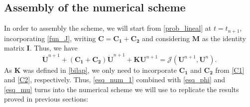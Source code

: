 \documentclass[12pt]{article}
\numberwithin{equation}{section}
\begin{document}
\subsection{Assembly of the numerical scheme}
In order to assembly the scheme, we will start from \eqref{prob_lineal} at $t = t_{n+1}$, incorporating \eqref{fun_J}, writing $\boldsymbol{C} = \boldsymbol{C_1} + \boldsymbol{C_2}$ and considering $\boldsymbol{M}$ as the identity matrix $\boldsymbol I$. Thus, we have 
\begin{equation}\label{esq_num_1}
    \boldsymbol{\ddot{U}}^{n+1} + (\boldsymbol{C_1+C_2})\boldsymbol{\dot{U}}^{n+1}+\boldsymbol{KU}^{n+1} = \mathcal{J}(\boldsymbol{U}^{n+1},\boldsymbol{U}^n).
\end{equation}
As $\boldsymbol{K}$ was defined in \eqref{bilap}, we only need to incorporate $\boldsymbol{C_1}$ and $\boldsymbol{C_2}$ from \eqref{C1} and \eqref{C2}, respectively. Thus, \eqref{esq_num_1} combined with \eqref{esq_phi} and \eqref{esq_mu} turns into the numerical scheme we will use to replicate the results proved in previous sections:
\end{document}
